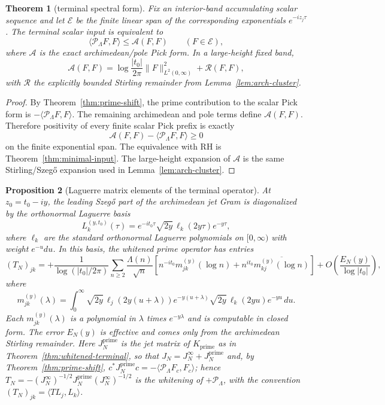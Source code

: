 \documentclass[11pt]{amsart}
\newtheorem{theorem}{Theorem}[section]
\newtheorem{proposition}[theorem]{Proposition}
\theoremstyle{definition}
\theoremstyle{remark}
\theoremstyle{definition}
\begin{document}
\begin{theorem}[terminal spectral form]\label{thm:terminal-spectral}
Fix an interior-band accumulating scalar sequence and let $\mathcal E$ be the finite linear span of
the corresponding exponentials $e^{-iz_j\tau}$.  The terminal scalar input is equivalent to
\[
   \langle\mathcal P_\Lambda F,F\rangle\le \mathcal A(F,F)
   \qquad(F\in\mathcal E),
\]
where $\mathcal A$ is the exact archimedean/pole Pick form.  In a large-height fixed band,
\[
   \mathcal A(F,F)=\log\frac{|t_0|}{2\pi}\|F\|_{L^2(0,\infty)}^2+\mathcal R(F,F),
\]
with $\mathcal R$ the explicitly bounded Stirling remainder from Lemma~\ref{lem:arch-cluster}.
\end{theorem}

\begin{proof}
By Theorem~\ref{thm:prime-shift}, the prime contribution to the scalar Pick form is
$-\langle\mathcal P_\Lambda F,F\rangle$.  The remaining archimedean and pole terms define
$\mathcal A(F,F)$.  Therefore positivity of every finite scalar Pick prefix is exactly
\[
   \mathcal A(F,F)-\langle\mathcal P_\Lambda F,F\rangle\ge0
\]
on the finite exponential span.  The equivalence with RH is Theorem~\ref{thm:minimal-input}.  The
large-height expansion of $\mathcal A$ is the same Stirling/Szeg\H{o} expansion used in
Lemma~\ref{lem:arch-cluster}.
\end{proof}

\begin{proposition}[Laguerre matrix elements of the terminal operator]\label{prop:laguerre-entries}
At $z_0=t_0-iy$, the leading Szeg\H{o} part of the archimedean jet Gram is diagonalized by the
orthonormal Laguerre basis
\[
   L_k^{(y,t_0)}(\tau)=e^{-it_0\tau}\sqrt{2y}\,\ell_k(2y\tau)e^{-y\tau},
\]
where $\ell_k$ are the standard orthonormal Laguerre polynomials on $[0,\infty)$ with weight
$e^{-u}du$.  In this basis, the whitened prime operator has entries
\[
   (T_N)_{jk}
   =
   +\frac1{\log(|t_0|/2\pi)}
   \sum_{n\ge2}\frac{\Lambda(n)}{\sqrt n}
   \left[
      n^{-it_0}m_{jk}^{(y)}(\log n)
      +n^{it_0}\overline{m_{kj}^{(y)}(\log n)}
   \right]
   +O\!\left(\frac{E_N(y)}{\log |t_0|}\right),
\]
where
\[
   m_{jk}^{(y)}(\lambda)
   =
   \int_0^\infty
      \sqrt{2y}\,\ell_j(2y(u+\lambda))e^{-y(u+\lambda)}
      \sqrt{2y}\,\ell_k(2yu)e^{-yu}\,du .
\]
Each $m_{jk}^{(y)}(\lambda)$ is a polynomial in $\lambda$ times $e^{-y\lambda}$ and is computable in
closed form.  The error $E_N(y)$ is effective and comes only from the archimedean Stirling remainder.
Here $J_N^{\mathrm{prime}}$ is the jet matrix of $K_{\mathrm{prime}}$ as in
Theorem~\ref{thm:whitened-terminal}, so that $J_N=J_N^\infty+J_N^{\mathrm{prime}}$ and, by
Theorem~\ref{thm:prime-shift}, $c^*J_N^{\mathrm{prime}}c=-\langle\mathcal P_\Lambda F_c,F_c\rangle$;
hence $T_N=-(J_N^\infty)^{-1/2}J_N^{\mathrm{prime}}(J_N^\infty)^{-1/2}$ is the whitening of
$+\mathcal P_\Lambda$, with the convention $(T_N)_{jk}=\langle TL_j,L_k\rangle$.
\end{proposition}
\end{document}
